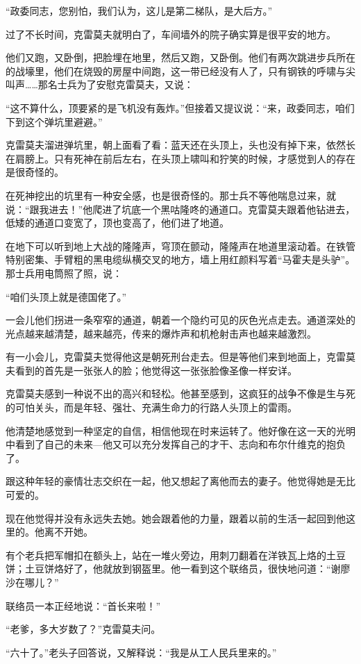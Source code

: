 “政委同志，您别怕，我们认为，这儿是第二梯队，是大后方。”

过了不长时间，克雷莫夫就明白了，车间墙外的院子确实算是很平安的地方。

他们又跑，又卧倒，把脸埋在地里，然后又跑，又卧倒。他们有两次跳进步兵所在的战壕里，他们在烧毁的房屋中间跑，这一带已经没有人了，只有钢铁的呼啸与尖叫声……那名士兵为了安慰克雷莫夫，又说：

“这不算什么，顶要紧的是飞机没有轰炸。”但接着又提议说：“来，政委同志，咱们下到这个弹坑里避避。”

克雷莫夫溜进弹坑里，朝上面看了看：蓝天还在头顶上，头也没有掉下来，依然长在肩膀上。只有死神在前后左右，在头顶上啸叫和狞笑的时候，才感觉到人的存在是很奇怪的。

在死神挖出的坑里有一种安全感，也是很奇怪的。那士兵不等他喘息过来，就说：“跟我进去！”他爬进了坑底一个黑咕隆咚的通道口。克雷莫夫跟着他钻进去，低矮的通道口变宽了，顶也变高了，他们进了地道。

在地下可以听到地上大战的隆隆声，穹顶在颤动，隆隆声在地道里滚动着。在铁管特别密集、手臂粗的黑电缆纵横交叉的地方，墙上用红颜料写着“马霍夫是头驴”。那士兵用电筒照了照，说：

“咱们头顶上就是德国佬了。”

一会儿他们拐进一条窄窄的通道，朝着一个隐约可见的灰色光点走去。通道深处的光点越来越清楚，越来越亮，传来的爆炸声和机枪射击声也越来越激烈。

有一小会儿，克雷莫夫觉得他这是朝死刑台走去。但是等他们来到地面上，克雷莫夫看到的首先是一张张人的脸；他觉得这一张张脸像圣像一样安详。

克雷莫夫感到一种说不出的高兴和轻松。他甚至感到，这疯狂的战争不像是生与死的可怕关头，而是年轻、强壮、充满生命力的行路人头顶上的雷雨。

他清楚地感觉到一种坚定的自信，相信他现在时来运转了。他好像在这一天的光明中看到了自己的未来—他又可以充分发挥自己的才干、志向和布尔什维克的抱负了。

跟这种年轻的豪情壮志交织在一起，他又想起了离他而去的妻子。他觉得她是无比可爱的。

现在他觉得并没有永远失去她。她会跟着他的力量，跟着以前的生活一起回到他这里的。他离不开她。

有个老兵把军帽扣在额头上，站在一堆火旁边，用刺刀翻着在洋铁瓦上烙的土豆饼；土豆饼烙好了，他就放到钢盔里。他一看到这个联络员，很快地问道：“谢廖沙在哪儿？”

联络员一本正经地说：“首长来啦！”

“老爹，多大岁数了？”克雷莫夫问。

“六十了。”老头子回答说，又解释说：“我是从工人民兵里来的。”

